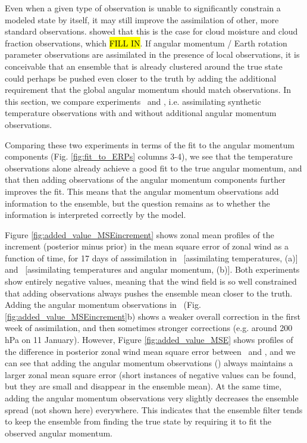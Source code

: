 Even when a given type of observation is unable to significantly constrain a modeled state by itself, it may still improve the assimilation of other, more standard observations.  
\cite{Pincus2011} showed that this is the case for cloud moisture and cloud fraction observations, which \hl{FILL IN}.
If angular momentum / Earth rotation parameter observations are assimilated in the presence of local observations, it is conceivable that an ensemble that is already clustered around the true state could perhaps be pushed even closer to the truth by adding the additional requirement that the global angular momentum should match observations. 
In this section, we compare experiments \RST~and \ERPRST, i.e. assimilating synthetic temperature observations with and without additional angular momentum observations.

Comparing these two experiments in terms of the fit to the angular momentum components (Fig. \ref{fig:fit_to_ERPs} columns 3-4), we see that the temperature observations alone already achieve a good fit to the true angular momentum, and that 
then adding observations of the angular momentum components further improves the fit.  
This means that the angular momentum observations add information to the ensemble, but the question remains as to whether the information is interpreted correctly by the model.

Figure \ref{fig:added_value_MSEincrement} shows zonal mean profiles of the increment (posterior minus prior) in the mean square error of zonal wind as a function of time, for 17 days of asssimilation in \RST~[assimilating temperatures, (a)] and \ERPRST~[assimilating temperatures and angular momentum, (b)].  
Both experiments show entirely negative values, meaning that the wind field is so well constrained that adding observations always pushes the ensemble mean closer to the truth. 
Adding the angular momentum observations in \ERPRST~(Fig. \ref{fig:added_value_MSEincrement}b) shows a weaker overall correction in the first week of assimilation, and then sometimes stronger corrections (e.g. around 200 hPa on 11 January). 
However, 
Figure \ref{fig:added_value_MSE} shows profiles of the difference in posterior zonal wind mean square error between \ERPRST~and \RST, and we can see that 
adding the angular momentum observations (\ERPRST) always maintains a larger zonal mean square error (short instances of negative values can be found, but they are small and disappear in the ensemble mean). 
At the same time, adding the angular momentum observations very slightly decreases the ensemble spread (not shown here) everywhere.  
This indicates that the ensemble filter tends to keep the ensemble from finding the true state by requiring it to fit the observed angular momentum.  


